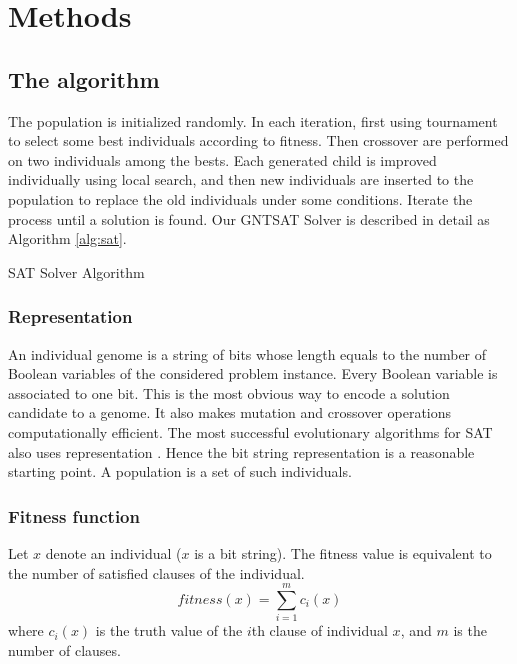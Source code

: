 \section{Methods}
\subsection{The algorithm}
The population is initialized randomly.  In each iteration, first using
tournament to select some best individuals according to fitness. Then
crossover are performed on two individuals among the bests. Each generated
child is improved individually using local search, and then new individuals
are inserted to the population to replace the old individuals under some
conditions. Iterate the process until a solution is found. Our GNTSAT Solver
is described in detail as Algorithm \ref{alg:sat}.
\begin{algorithm}
	\SetAlgoLined
	\caption{SAT Solver Algorithm}
	\label{alg:sat}
	\BlankLine
\end{algorithm}

\subsubsection{Representation}
An individual genome is a string of bits whose length equals to the number of
Boolean variables of the considered problem instance. Every Boolean variable
is associated to one bit. This is the most obvious way to encode a solution
candidate to a genome. It also makes mutation and crossover operations
computationally efficient. The most successful evolutionary algorithms for SAT
also uses representation \parencite{gottlieb_marchiori_rossi_2002}. Hence the bit string
representation is a reasonable starting point. A population is a set of such
individuals.

\subsubsection{Fitness function}
Let $x$ denote an individual ($x$ is a
bit string). The fitness value is equivalent to the number of satisfied
clauses of the individual.
\begin{equation*}
	\mathit{fitness}(x) = \sum_{i=1}^m c_i(x)
\end{equation*}
where $c_i(x)$ is the truth value of the
$i$th clause of individual $x$, and
$m$ is the number of clauses.

